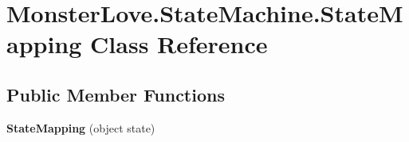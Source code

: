 \hypertarget{class_monster_love_1_1_state_machine_1_1_state_mapping}{}\section{Monster\+Love.\+State\+Machine.\+State\+Mapping Class Reference}
\label{class_monster_love_1_1_state_machine_1_1_state_mapping}
\subsection*{Public Member Functions}
\begin{DoxyCompactItemize}
\item 
{\bfseries State\+Mapping} (object state)\hypertarget{class_monster_love_1_1_state_machine_1_1_state_mapping_a9f1183b397377a67a37af785e710da8d}{}\label{class_monster_love_1_1_state_machine_1_1_state_mapping_a9f1183b397377a67a37af785e710da8d}

\end{DoxyCompactItemize}
